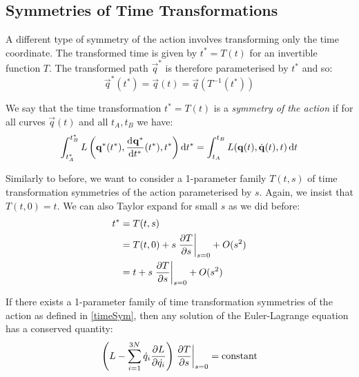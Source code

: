 \documentclass[../main.tex]{subfiles}
\begin{document}
\subsection{Symmetries of Time Transformations}
A different type of symmetry of the action involves transforming only the time coordinate.
The transformed time is given by $t^{*} = T(t)$ for an invertible function $T$.
The transformed path $\vec{q}^{*}$ is therefore parameterised by $t^{*}$ and so:
\[
  \vec{q}^{*}(t^{*}) = \vec{q}(t) = \vec{q}(T^{-1}(t^{*}))
\]
\begin{definition}
  We say that the time transformation $t^{*} = T(t)$ is a \textit{symmetry of the action} if for all curves $\vec{q}(t)$ and all $t_A, t_B$ we have: \label{timeSym}
  \begin{equation}
    \int_{t^{*}_A}^{t^{*}_B} L\left(\vec{q}^{*}(t^{*}), \deriv{\vec{q}^{*}}{{t^{*}}}(t^{*}), t^{*}\right) \d{t^{*}} = \int_{t_{A}}^{t_{B}} L(\vec{q}(t), \dot{\vec{q}}(t), t) \d{t} \label{timeSymEqn}
  \end{equation}
\end{definition}
Similarly to before, we want to consider a 1-parameter family $T(t, s)$ of time transformation symmetries of the action parameterised by $s$.
Again, we insist that $T(t, 0) = t$.
We can also Taylor expand for small $s$ as we did before:
\begin{align}
  t^{*} &= T(t, s) \nonumber \\
        &= T(t, 0) + s \at{\pderiv{T}{s}}{s = 0} + O(s^2) \nonumber \\
        &= t + s \at{\pderiv{T}{s}}{s = 0} + O(s^2) \label{tStar}
\end{align}
\begin{theorem}
  If there exists a 1-parameter family of time transformation symmetries of the action as defined in \cref{timeSym}, then any solution of the Euler-Lagrange equation has a conserved quantity: \label{noetherV2}
  \[
    \left(L - \sum_{i = 1}^{3N} \dot{q}_i \pderiv{L}{\dot{q_i}}\right)\at{\pderiv{T}{s}}{s = 0} = \text{constant}
  \]
\end{theorem}
\end{document}
